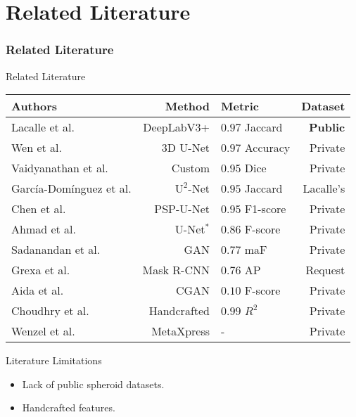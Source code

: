 \section{Related Literature}


\begin{frame}{}
    \frametitle{Related Literature}
\end{frame}


\begin{frame}{Related Literature}
    \begin{table}
        \centering
        \setlength{\tabcolsep}{10pt}

        \begin{tabular}{lrlr}
            \textbf{Authors} & \textbf{Method} & \textbf{Metric} & \textbf{Dataset} \\
            \toprule
            Lacalle et al. & DeepLabV3+ & $0.97$ Jaccard & \textbf{Public} \\
            Wen et al. & 3D U-Net & $0.97$ Accuracy & Private \\
            Vaidyanathan et al. & Custom & $0.95$ Dice & Private \\
            García-Domínguez et al. & $\mathrm{U}^2$-Net & $0.95$ Jaccard & Lacalle's \\
            Chen et al. & PSP-U-Net & $0.95$ F1-score & Private \\
            Ahmad et al. & U-Net$^*$ & $0.86$ F-score & Private \\
            Sadanandan et al. & GAN & $0.77$ maF & Private \\
            Grexa et al. & Mask R-CNN & $0.76$ AP & Request \\
            Aida et al. & CGAN & $0.10$ F-score & Private \\
            \midrule
            Choudhry et al. & Handcrafted & $0.99$ $R^2$ & Private \\
            Wenzel et al. & MetaXpress & - & Private \\
        \end{tabular}
    \end{table}
\end{frame}

\begin{frame}{Literature Limitations}
    \begin{itemize}
        \item Lack of public spheroid datasets.
        \item Handcrafted features.
    \end{itemize}
\end{frame}

